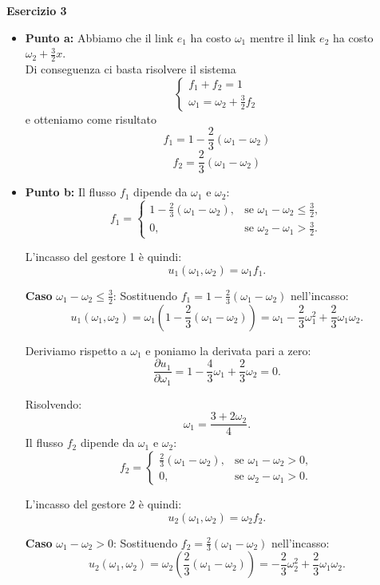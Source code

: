 \documentclass[a4paper,12pt]{article}
\begin{document}
	\centering \textbf{Esercizio 3}\\
	\begin{itemize}
		\item \textbf{Punto a: }
		Abbiamo che il link $e_1$ ha costo $\omega_1$ mentre il link $e_2$ ha costo $\omega_2 + \frac{3}{2}x$.\\
		Di conseguenza ci basta risolvere il sistema\\
		\[
		\begin{cases}
			f_1 + f_2 = 1  \\
			\omega_1 = \omega_2 +\frac{3}{2}f_2 
		\end{cases}
		\]
		e otteniamo come risultato \\
		\[
		f_1=1-\frac{2}{3}(\omega_1-\omega_2)
		\]
		\[
		f_2=\frac{2}{3}(\omega_1-\omega_2)
		\]
		\item \textbf{Punto b: }
		Il flusso $f_1$ dipende da $\omega_1$ e $\omega_2$:
		\[
		f_1 =
		\begin{cases} 
			1 - \frac{2}{3} (\omega_1 - \omega_2), & \text{se } \omega_1 - \omega_2 \leq \frac{3}{2}, \\
			0, & \text{se } \omega_2 - \omega_1 > \frac{3}{2}.
		\end{cases}
		\]
		
		L'incasso del gestore 1 è quindi:
		\[
		u_1(\omega_1, \omega_2) = \omega_1 f_1.
		\]
		
		\textbf{Caso} $\omega_1 - \omega_2 \leq \frac{3}{2}$:
		Sostituendo $f_1 = 1 - \frac{2}{3} (\omega_1 - \omega_2)$ nell'incasso:
		\[
		u_1(\omega_1, \omega_2) = \omega_1 \left( 1 - \frac{2}{3} (\omega_1 - \omega_2) \right) 
		= \omega_1 - \frac{2}{3} \omega_1^2 + \frac{2}{3} \omega_1 \omega_2.
		\]
		
		Deriviamo rispetto a $\omega_1$ e poniamo la derivata pari a zero:
		\[
		\frac{\partial u_1}{\partial \omega_1} = 1 - \frac{4}{3} \omega_1 + \frac{2}{3} \omega_2 = 0.
		\]
		
		Risolvendo:
		\[
		\omega_1 = \frac{3 + 2 \omega_2}{4}.
		\]
		Il flusso $f_2$ dipende da $\omega_1$ e $\omega_2$:
		\[
		f_2 =
		\begin{cases} 
			\frac{2}{3} (\omega_1 - \omega_2), & \text{se } \omega_1 - \omega_2 > 0, \\
			0, & \text{se } \omega_2 - \omega_1 > 0.
		\end{cases}
		\]
		
		L'incasso del gestore 2 è quindi:
		\[
		u_2(\omega_1, \omega_2) = \omega_2 f_2.
		\]
		
		\textbf{Caso} $\omega_1 - \omega_2 >0$:
		Sostituendo $f_2 = \frac{2}{3} (\omega_1 - \omega_2)$ nell'incasso:
		\[
		u_2(\omega_1, \omega_2) = \omega_2 \left(  \frac{2}{3} (\omega_1 - \omega_2) \right) 
		=  - \frac{2}{3} \omega_2^2 + \frac{2}{3} \omega_1 \omega_2.
		\]
		

\end{itemize}
\end{document}
